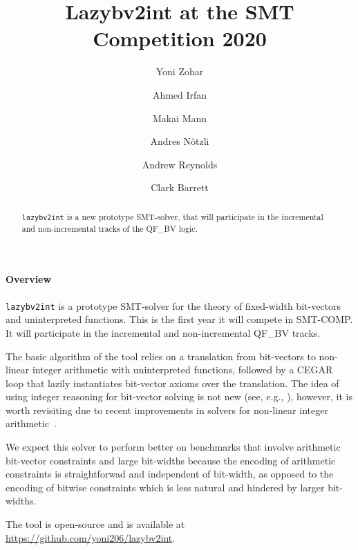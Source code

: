 \documentclass{easychair}
\newcommand{\lazybvtoint}{\texttt{lazybv2int}\xspace}
\newcommand{\smtcomp}{SMT-COMP\xspace}
\newcommand{\qfbv}{QF\_BV\xspace}
\begin{document}
\author{
		Yoni Zohar\and
		Ahmed Irfan \and
		Makai Mann \and
		Andres N\"otzli \and
		Andrew Reynolds\and
		Clark Barrett
}

\title{Lazybv2int at the SMT Competition 2020}

\maketitle


\noindent
\begin{abstract}
\lazybvtoint is a new prototype SMT-solver, that  will participate in the incremental and non-incremental tracks of the \qfbv logic.
\end{abstract}

\paragraph{Overview}
\lazybvtoint is a prototype SMT-solver for the theory of fixed-width bit-vectors and uninterpreted functions.
This is the first year it will compete in \smtcomp.
It will participate in the incremental and non-incremental \qfbv tracks.

The basic algorithm of the tool relies on a translation from bit-vectors to
non-linear integer arithmetic with uninterpreted functions, followed by a CEGAR
loop \cite{cegar} that lazily instantiates bit-vector axioms over the
translation. The idea of using integer reasoning for bit-vector solving is not
new (see, e.g.,
\cite{DBLP:journals/entcs/BozzanoBCFHKPS06,DBLP:conf/fmcad/BackemanRZ18}),
however, it is worth revisiting due to recent improvements in solvers for
non-linear integer arithmetic~\cite{DBLP:conf/vmcai/Jovanovic17, DBLP:conf/sat/CimattiGIRS18}.

We expect this solver to perform better on benchmarks that involve arithmetic
bit-vector constraints and large bit-widths because the encoding of arithmetic
constraints is straightforwad and independent of bit-width, as opposed to the
encoding of bitwise constraints which is less natural and hindered by larger
bit-widths.

The tool is open-source and is available at \url{https://github.com/yoni206/lazybv2int}.
\end{document}
